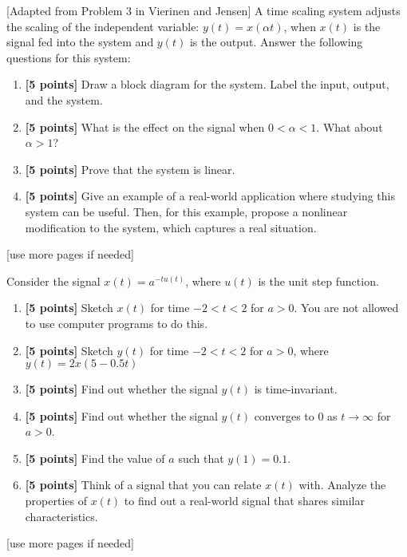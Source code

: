 \documentclass{ee102_pset}
\author{\rule{3cm}{0.4pt}} %
\begin{document}

[Adapted from Problem 3 in Vierinen and Jensen] A time scaling system adjusts the scaling of the independent variable: $y(t) = x(\alpha t)$, when $x(t)$ is the signal fed into the system
and $y(t)$ is the output. Answer the following questions for this system:
\begin{enumerate}
    \item \textbf{[5 points]} Draw a block diagram for the system. Label the input, output, and the system.
    \item \textbf{[5 points]} What is the effect on the signal when $0 < \alpha < 1$. What about $\alpha > 1$?
    
    \item \textbf{[5 points]} Prove that the system is linear.
    \item \textbf{[5 points]} Give an example of a real-world application where studying this system can be useful. Then, for this example, propose a nonlinear modification to the system, which captures a real situation.  
\end{enumerate}

\vspace*{\fill}
\begin{center}
[use more pages if needed]
\end{center}
Consider the signal $x(t) = a^{-tu(t)}$, where $u(t)$ is the unit step function. 
\begin{enumerate}
    \item \textbf{[5 points]} Sketch $x(t)$ for time $-2 < t < 2$ for $a > 0$. You are not allowed to use computer programs to do this.
    \item \textbf{[5 points]} Sketch $y(t)$ for time $-2 < t < 2$ for $a>0$, where $y(t) = 2x(5 - 0.5t)$
    \item \textbf{[5 points]} Find out whether the signal $y(t)$ is time-invariant.
    \item \textbf{[5 points]} Find out whether the signal $y(t)$ converges to 0 as $t \to \infty$ for $a > 0$. 
    \item \textbf{[5 points]} Find the value of $a$ such that $y(1) = 0.1$.
    \item \textbf{[5 points]} Think of a signal that you can relate $x(t)$ with. Analyze the properties of $x(t)$ to find out a real-world signal that shares similar characteristics.
\end{enumerate}
\vspace*{\fill}
\begin{center}
[use more pages if needed]
\end{center}
\end{document}
